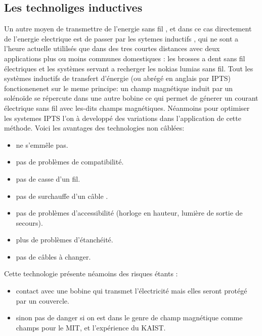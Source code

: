 \documentclass[12pt]{report}
\begin{document}
\subsection{Les technoliges inductives}
  Un autre moyen de transmettre de l'energie sans fil , et dans ce cas directement de l'energie electrique est de passer par les sytemes inductifs , qui ne sont a l'heure actuelle utililsés que dans des tres courtes distances avec deux applications plus ou moins communes domestiques : les brosses a dent sans fil électriques et les systèmes servant a recherger les nokias lumias sans fil. Tout les systèmes inductifs de transfert d'énergie (ou abrégé en anglais par IPTS) fonctionenenet sur le meme principe: un champ magnétique induit par un solénoïde se répercute dans une autre bobine ce qui permet de génerer un courant électrique sans fil avec les-dits champs magnétiques. Néanmoins pour optimiser les systemes IPTS l'on à developpé des variations dans l'application de cette méthode.
Voici les avantages des technologies non câblées:
\begin{itemize}
	\item ne s'emmêle pas.
	\item pas de problèmes de compatibilité.
	\item pas de casse d'un fil.
	\item pas de surchauffe d'un câble .
	\item pas de problèmes d'accessibilité (horloge en hauteur, lumière de sortie de secours).
	\item plus de problèmes d'étanchéité.
	\item pas de câbles à changer.
\end{itemize}
Cette technologie présente néamoins des risques étants :
\begin{itemize}
	\item contact avec une bobine qui transmet l'électricité mais elles seront protégé par un couvercle.
	\item sinon pas de danger si on est dans le genre de champ magnétique comme champs pour le MIT, et l'expérience du KAIST.
\end{itemize}
\end{document}

